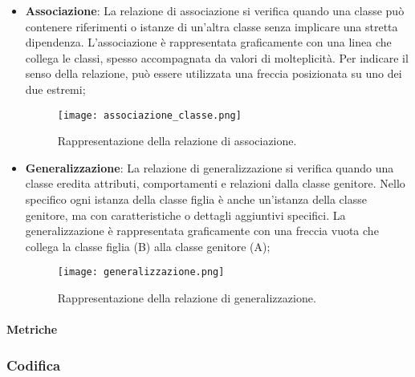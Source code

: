 \begin{itemize}
        \item \textbf{Associazione}: La relazione di associazione si verifica quando una classe può contenere riferimenti o istanze di un’altra classe senza implicare una stretta dipendenza. L'associazione è rappresentata graficamente con una linea che collega le classi, spesso accompagnata da valori di molteplicità. Per indicare il senso della relazione, può essere utilizzata una freccia posizionata su uno dei due estremi;
        \begin{figure}[H]
            \centering
            \texttt{[image: associazione\_classe.png]}
            \caption{Rappresentazione della relazione di associazione.}
        \end{figure}
        
        \item \textbf{Generalizzazione}: La relazione di generalizzazione si verifica quando una classe eredita attributi, comportamenti e relazioni dalla classe genitore. Nello specifico ogni istanza della classe figlia è anche un'istanza della classe genitore, ma con caratteristiche o dettagli aggiuntivi specifici. La generalizzazione è rappresentata graficamente con una freccia vuota che collega la classe figlia (B) alla classe genitore (A);
        \begin{figure}[H]
            \centering
            \texttt{[image: generalizzazione.png]}
            \caption{Rappresentazione della relazione di generalizzazione.}
        \end{figure}
     \end{itemize}
    
    \paragraph{Metriche}

    
    \subsubsection{Codifica}

